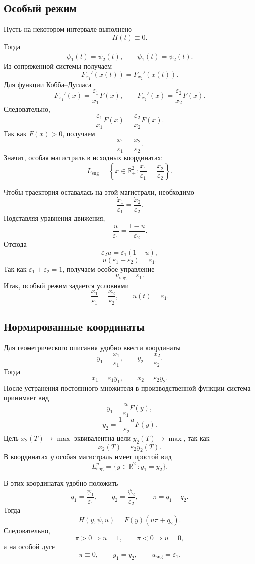 \documentclass[12pt,a4paper]{article}
\newcommand{\R}{\mathbb{R}}
\newcommand{\eps}{\varepsilon}
\newcommand{\sng}{\mathrm{sng}}
\begin{document}
\subsection{Особый режим}

Пусть на некотором интервале выполнено
\[
    \Pi(t)\equiv0.
\]
Тогда
\[
    \psi_1(t)=\psi_2(t),
    \qquad
    \dot\psi_1(t)=\dot\psi_2(t).
\]
Из сопряженной системы получаем
\[
    F_{x_1}'(x(t))=F_{x_2}'(x(t)).
\]
Для функции Кобба--Дугласа
\[
    F_{x_1}'(x)=\frac{\eps_1}{x_1}F(x),
    \qquad
    F_{x_2}'(x)=\frac{\eps_2}{x_2}F(x).
\]
Следовательно,
\[
    \frac{\eps_1}{x_1}F(x)=\frac{\eps_2}{x_2}F(x).
\]
Так как \(F(x)>0\), получаем
\[
    \frac{x_1}{\eps_1}=\frac{x_2}{\eps_2}.
\]
Значит, особая магистраль в исходных координатах:
\[
    L_{\sng}=\left\{x\in\R^2_+:
    \frac{x_1}{\eps_1}=\frac{x_2}{\eps_2}\right\}.
\]

Чтобы траектория оставалась на этой магистрали, необходимо
\[
    \frac{\dot x_1}{\eps_1}=\frac{\dot x_2}{\eps_2}.
\]
Подставляя уравнения движения,
\[
    \frac{u}{\eps_1}=\frac{1-u}{\eps_2}.
\]
Отсюда
\[
    \eps_2u=\eps_1(1-u),
\]
\[
    u(\eps_1+\eps_2)=\eps_1.
\]
Так как \(\eps_1+\eps_2=1\), получаем особое управление
\[
    u_{\sng}=\eps_1.
\]
Итак, особый режим задается условиями
\[
    \frac{x_1}{\eps_1}=\frac{x_2}{\eps_2},
    \qquad
    u(t)=\eps_1.
\]

\subsection{Нормированные координаты}

Для геометрического описания удобно ввести координаты
\[
    y_1=\frac{x_1}{\eps_1},
    \qquad
    y_2=\frac{x_2}{\eps_2}.
\]
Тогда
\[
    x_1=\eps_1y_1,
    \qquad
    x_2=\eps_2y_2.
\]
После устранения постоянного множителя в производственной функции система принимает вид
\[
    \dot y_1=\frac{u}{\eps_1}F(y),
\]
\[
    \dot y_2=\frac{1-u}{\eps_2}F(y).
\]
Цель \(x_2(T)\to\max\) эквивалентна цели \(y_2(T)\to\max\), так как
\[
    x_2(T)=\eps_2y_2(T).
\]
В координатах \(y\) особая магистраль имеет простой вид
\[
    L_{\sng}^y=\{y\in\R^2_+: y_1=y_2\}.
\]

В этих координатах удобно положить
\[
    q_1=\frac{\psi_1}{\eps_1},
    \qquad
    q_2=\frac{\psi_2}{\eps_2},
    \qquad
    \pi=q_1-q_2.
\]
Тогда
\[
    H(y,\psi,u)=F(y)(u\pi+q_2).
\]
Следовательно,
\[
    \pi>0\Rightarrow u=1,
    \qquad
    \pi<0\Rightarrow u=0,
\]
а на особой дуге
\[
    \pi\equiv0,
    \qquad
    y_1=y_2,
    \qquad
    u_{\sng}=\eps_1.
\]
\end{document}
